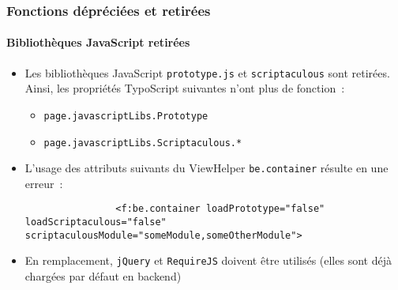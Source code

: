 
\begin{frame}[fragile]
	\frametitle{Fonctions dépréciées et retirées}
	\framesubtitle{Bibliothèques JavaScript retirées}

	\begin{itemize}

		\item Les bibliothèques JavaScript \texttt{prototype.js} et \texttt{scriptaculous} sont retirées.
			Ainsi, les propriétés TypoScript suivantes n'ont plus de fonction~:

			\begin{itemize}
				\item \texttt{page.javascriptLibs.Prototype}
				\item \texttt{page.javascriptLibs.Scriptaculous.*}
			\end{itemize}

		\item L'usage des attributs suivants du ViewHelper \texttt{be.container} résulte en une erreur~:
			\begin{lstlisting}
				<f:be.container loadPrototype="false" loadScriptaculous="false" scriptaculousModule="someModule,someOtherModule">
			\end{lstlisting}

		\item En remplacement, \texttt{jQuery} et \texttt{RequireJS} doivent être utilisés\newline
			(elles sont déjà chargées par défaut en backend)

	\end{itemize}

\end{frame}


